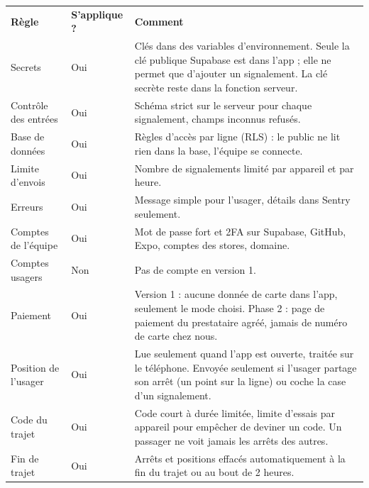 \documentclass[11pt,a4paper]{article}
\newcommand{\hd}[1]{\textbf{\color{white}#1}}
\newcommand{\hdrow}{\rowcolor{brand}}
\begin{document}
\begin{xltabular}{\textwidth}{@{}P{3.2cm} P{2.3cm} Y@{}}
\hdrow \hd{Règle} & \hd{S'applique ?} & \hd{Comment} \\
Secrets & Oui & Clés dans des variables d'environnement. Seule la clé publique Supabase est dans l'app ; elle ne permet que d'ajouter un signalement. La clé secrète reste dans la fonction serveur. \\
Contrôle des entrées & Oui & Schéma strict sur le serveur pour chaque signalement, champs inconnus refusés. \\
Base de données & Oui & Règles d'accès par ligne (RLS) : le public ne lit rien dans la base, l'équipe se connecte. \\
Limite d'envois & Oui & Nombre de signalements limité par appareil et par heure. \\
Erreurs & Oui & Message simple pour l'usager, détails dans Sentry seulement. \\
Comptes de l'équipe & Oui & Mot de passe fort et 2FA sur Supabase, GitHub, Expo, comptes des stores, domaine. \\
Comptes usagers & Non & Pas de compte en version 1. \\
Paiement & Oui & Version 1 : aucune donnée de carte dans l'app, seulement le mode choisi. Phase 2 : page de paiement du prestataire agréé, jamais de numéro de carte chez nous. \\
Position de l'usager & Oui & Lue seulement quand l'app est ouverte, traitée sur le téléphone. Envoyée seulement si l'usager partage son arrêt (un point sur la ligne) ou coche la case d'un signalement. \\
Code du trajet & Oui & Code court à durée limitée, limite d'essais par appareil pour empêcher de deviner un code. Un passager ne voit jamais les arrêts des autres. \\
Fin de trajet & Oui & Arrêts et positions effacés automatiquement à la fin du trajet ou au bout de 2 heures. \\
\end{xltabular}
\end{document}
